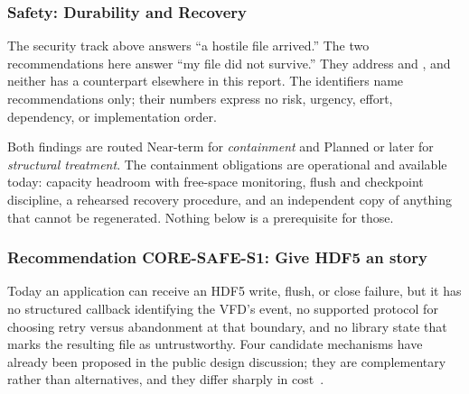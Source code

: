 \documentclass[../main.tex]{subfiles}
\begin{document}
\subsubsection{Safety: Durability and Recovery}

The security track above answers ``a hostile file arrived.'' The two
recommendations here answer ``my file did not survive.'' They address
 and , and neither has a counterpart
elsewhere in this report. The  identifiers name
recommendations only; their numbers express no risk, urgency, effort,
dependency, or implementation order.

Both findings are routed Near-term for \emph{containment} and Planned or later
for \emph{structural treatment}. The containment obligations are operational
and available today: capacity headroom with free-space monitoring, flush and
checkpoint discipline, a rehearsed recovery procedure, and an independent copy
of anything that cannot be regenerated. Nothing below is a prerequisite for
those.

\subsubsection*{Recommendation CORE-SAFE-S1: Give HDF5 an  story}

Today an application can receive an HDF5 write, flush, or close failure, but it
has no structured callback identifying the VFD's  event, no
supported protocol for choosing retry versus abandonment at that boundary, and
no library state that marks the resulting file as untrustworthy. Four candidate
mechanisms have already been proposed in the public design discussion; they are
complementary rather than alternatives, and they differ sharply in
cost~\cite{forum-enospc-11714}.
\end{document}
